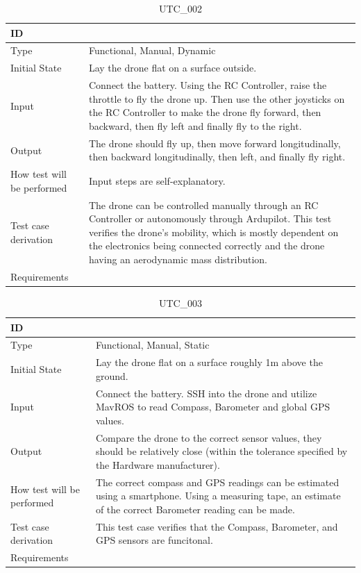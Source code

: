 \documentclass[12pt, titlepage]{article}
\begin{document}
\begin{table}[!h]
\begin{center}
\caption {UTC\_002}
\label{tab:UTC_002}
\begin{tabular}{ | m{3.2cm} | m{12.2cm} | } 
\hline
ID & \nameref{tab:UTC_002} \\ 
\hline
Type &  Functional, Manual, Dynamic  \\ 
\hline
Initial State & Lay the drone flat on a surface outside.\\ 
\hline
Input & Connect the battery. Using the RC Controller, raise the throttle to fly the drone up. Then use the other joysticks on the RC Controller to make the drone fly forward, then backward, then fly left and finally fly to the right.
 \\ 
\hline
Output &  The drone should fly up, then move forward longitudinally, then backward longitudinally, then left, and finally fly right.\\ 
\hline
How test will be performed & Input steps are self-explanatory. \\ 
\hline
Test case derivation & The drone can be controlled manually through an RC Controller or autonomously through Ardupilot. This test verifies the drone's mobility, which is mostly dependent on the electronics being connected correctly and the drone having an aerodynamic mass distribution.   \\ 
\hline
Requirements &  \\ 
\hline
\end{tabular}
\end{center}
\end{table}


\begin{table}[!h]
\begin{center}
\caption {UTC\_003}
\label{tab:UTC_003}
\begin{tabular}{ | m{3.2cm} | m{12.2cm} | } 
\hline
ID & \nameref{tab:UTC_003} \\ 
\hline
Type &  Functional, Manual, Static  \\ 
\hline
Initial State & Lay the drone flat on a surface roughly 1m above the ground.\\ 
\hline
Input & Connect the battery. SSH into the drone and utilize MavROS to read Compass, Barometer and global GPS values. 
 \\ 
\hline
Output &  Compare the drone to the correct sensor values, they should be relatively close (within the tolerance specified by the Hardware manufacturer).\\ 
\hline
How test will be performed & The correct compass and GPS readings can be estimated using a smartphone. Using a measuring tape, an estimate of the correct Barometer reading can be made.  \\ 
\hline
Test case derivation & This test case verifies that the Compass, Barometer, and GPS sensors are funcitonal. \\ 
\hline
Requirements &  \\ 
\hline
\end{tabular}
\end{center}
\end{table}
\end{document}
